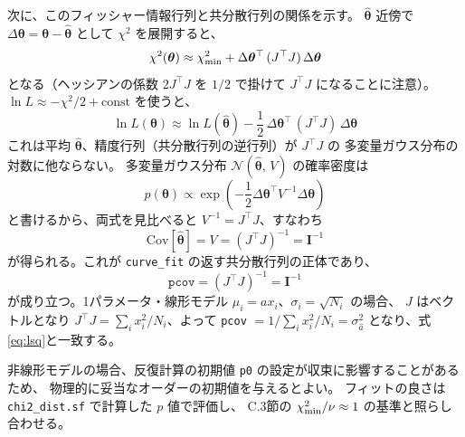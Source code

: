 \documentclass[uplatex,dvipdfmx,12pt,nomag]{jsarticle}
\begin{document}
次に、このフィッシャー情報行列と共分散行列の関係を示す。
$\hat{\bm{\theta}}$ 近傍で $\Delta\bm{\theta} = \bm{\theta} - \hat{\bm{\theta}}$ として
$\chi^2$ を展開すると、
\begin{equation}
  \chi^2(\bm{\theta})
  \approx \chi^2_{\rm min}
    + \Delta\bm{\theta}^\top\,(J^\top J)\,\Delta\bm{\theta}
\end{equation}
となる（ヘッシアンの係数 $2J^\top J$ を $1/2$ で掛けて $J^\top J$ になることに注意）。
$\ln L \approx -\chi^2/2 + \mathrm{const}$ を使うと、
\begin{equation}
  \ln L(\bm{\theta})
  \approx \ln L(\hat{\bm{\theta}})
    - \frac{1}{2}\,\Delta\bm{\theta}^\top\,(J^\top J)\,\Delta\bm{\theta}
\end{equation}
これは平均 $\hat{\bm{\theta}}$、精度行列（共分散行列の逆行列）が $J^\top J$ の
多変量ガウス分布の対数に他ならない。
多変量ガウス分布 $\mathcal{N}(\hat{\bm{\theta}},\,V)$ の確率密度は
\begin{equation}
  p(\bm{\theta}) \propto \exp\!\left(-\frac{1}{2}\Delta\bm{\theta}^\top V^{-1}\Delta\bm{\theta}\right)
\end{equation}
と書けるから、両式を見比べると $V^{-1} = J^\top J$、すなわち
\begin{equation}
  \mathrm{Cov}[\hat{\bm{\theta}}] = V = (J^\top J)^{-1} = \bm{I}^{-1}
\end{equation}
が得られる。これが \texttt{curve\_fit} の返す共分散行列の正体であり、
\begin{equation}
  \texttt{pcov} = (J^\top J)^{-1} = \bm{I}^{-1}
  \label{eq:pcov-fisher}
\end{equation}
が成り立つ。1パラメータ・線形モデル $\mu_i = a x_i$、$\sigma_i = \sqrt{N_i}$ の場合、
$J$ はベクトルとなり $J^\top J = \sum_i x_i^2/N_i$、よって
\texttt{pcov} $= 1/\sum_i x_i^2/N_i = \sigma_{\hat{a}}^2$ となり、式\eqref{eq:lsq}と一致する。

非線形モデルの場合、反復計算の初期値 \texttt{p0} の設定が収束に影響することがあるため、
物理的に妥当なオーダーの初期値を与えるとよい。
フィットの良さは \texttt{chi2\_dist.sf} で計算した $p$ 値で評価し、
C.3節の $\chi^2_{\rm min}/\nu \approx 1$ の基準と照らし合わせる。
\end{document}
